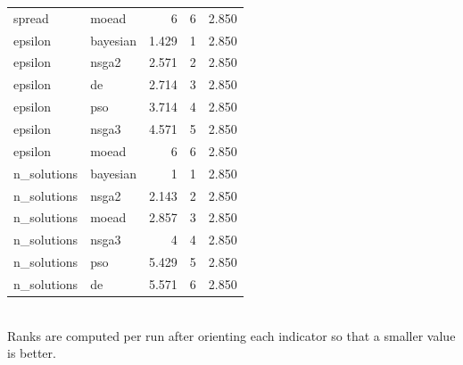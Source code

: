 \begin{table}[!t]
\begin{tabular}{llrrr}
spread & moead & 6 & 6 & 2.850 \\
epsilon & bayesian & 1.429 & 1 & 2.850 \\
epsilon & nsga2 & 2.571 & 2 & 2.850 \\
epsilon & de & 2.714 & 3 & 2.850 \\
epsilon & pso & 3.714 & 4 & 2.850 \\
epsilon & nsga3 & 4.571 & 5 & 2.850 \\
epsilon & moead & 6 & 6 & 2.850 \\
n\_solutions & bayesian & 1 & 1 & 2.850 \\
n\_solutions & nsga2 & 2.143 & 2 & 2.850 \\
n\_solutions & moead & 2.857 & 3 & 2.850 \\
n\_solutions & nsga3 & 4 & 4 & 2.850 \\
n\_solutions & pso & 5.429 & 5 & 2.850 \\
n\_solutions & de & 5.571 & 6 & 2.850 \\
\bottomrule
\end{tabular}
\\[2pt] \footnotesize Ranks are computed per run after orienting each indicator so that a smaller value is better.
\end{table}
